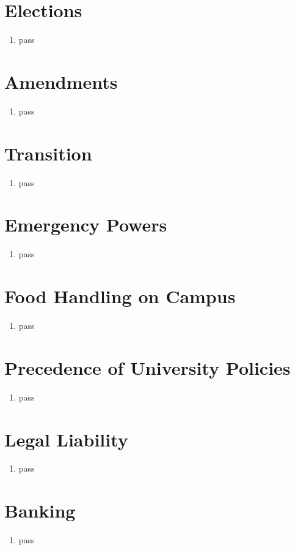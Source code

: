 \documentclass[12pt]{article}
\begin{document}
\section{Elections}
\begin{enumerate}[{10}.1]
    \item pass
\end{enumerate}

\section{Amendments}
\begin{enumerate}[{11}.1]
    \item pass
\end{enumerate}

\section{Transition}
\begin{enumerate}[{12}.1]
    \item pass
\end{enumerate}

\section{Emergency Powers}
\begin{enumerate}[{13}.1]
    \item pass
\end{enumerate}

\section{Food Handling on Campus}
\begin{enumerate}[{14}.1]
    \item pass
\end{enumerate}

\section{Precedence of University Policies}
\begin{enumerate}[{15}.1]
    \item pass
\end{enumerate}

\section{Legal Liability}
\begin{enumerate}[{16}.1]
    \item pass
\end{enumerate}

\section{Banking}
\begin{enumerate}[{17}.1]
    \item pass
\end{enumerate}
\end{document}
